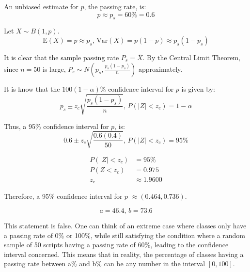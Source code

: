 \documentclass[a4paper]{article}
\newcommand{\E}{\mathrm E}
\newcommand{\Var}{\mathrm{Var}}
\begin{document}
An unbiased estimate for \(p\), the passing rate, is:
\[p\approx p_s=60\%=0.6\]

Let \(X\sim B(1,p)\).
\[\E(X)=p\approx p_s,\,\Var(X)=p(1-p)\approx p_s(1-p_s)\]

It is clear that the sample passing rate \(P_s=\bar X\). By the Central Limit Theorem, since \(n=50\) is large, \(P_s\sim N\left(p_s,\frac{p_s(1-p_s)}n\right)\) approximately.

It is know that the \(100(1-\alpha)\%\) confidence interval for \(p\) is given by:
\[p_s\pm z_c\sqrt{\frac{p_s(1-p_s)}n},\,P(|Z|<z_c)=1-\alpha\]

Thus, a 95\% confidence interval for \(p\), is:
\[0.6\pm z_c\sqrt{\frac{0.6(0.4)}{50}},\,P(|Z|<z_c)=95\%\]

\[\begin{aligned}
	P(|Z|<z_c)&=95\%\\
	P(Z<z_c)&=0.975\\
	z_c&\approx1.9600
\end{aligned}\]

Therefore, a 95\% confidence interval for \(p\) \(\approx\boxed{(0.464,0.736)}\).

\[a=\boxed{46.4},\,b=\boxed{73.6}\]

This statement is false. One can think of an extreme case where classes only have a passing rate of 0\% or 100\%, while still satisfying the condition where a random sample of 50 scripts having a passing rate of 60\%, leading to the confidence interval concerned. This means that in reality, the percentage of classes having a passing rate between a\% and b\% can be any number in the interval \([0,100]\).
\end{document}

